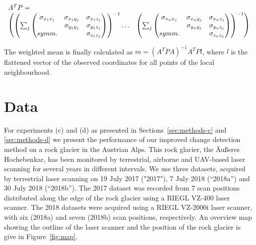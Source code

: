 \documentclass[preprint,12pt,3p]{elsarticle}
\begin{document}
\begin{equation}
\begin{array}{lr}
A^TP = \\
\begin{pmatrix}
 \left(\sum_j  \begin{pmatrix}
 \sigma_{x_1 x_j} & 
\sigma_{x_1 y_j} & 
 \sigma_{x_1 z_j} \\
 & 
\sigma_{y_1 y_j} & 
\sigma_{y_1 z_j} \\
symm. & 
 & 
\sigma_{z_1 z_j} \\
\end{pmatrix} \right ) ^{-1}
\dots
&
\left(\sum_j  \begin{pmatrix}
 \sigma_{x_n x_j} & 
\sigma_{x_n y_j} & 
 \sigma_{x_n z_j} \\
 & 
\sigma_{y_n y_j} & 
\sigma_{y_n z_j} \\
symm. & 
 & 
\sigma_{z_n z_j} \\
\end{pmatrix} \right ) ^{-1}
\end{pmatrix}
\end{array}
\\
\label{eq:ATP}    
\end{equation}

The weighted mean is finally calculated as $m = (A^TPA)^{-1} A^TPl$, where $l$ is the flattened vector of the observed coordinates for all points of the local neighbourhood.


\section{Data}

For experiments (c) and (d) as presented in Sections~\ref{sec:methods-c} and \ref{sec:methods-d} we present the performance of our improved change detection method on a rock glacier in the Austrian Alps. This rock glacier, the Äußeres Hochebenkar, has been monitored by terrestrial, airborne and UAV-based laser scanning for several years in different intervals. We use three datasets, acquired by terrestrial laser scanning on 19 July 2017 ("2017"), 7 July 2018 (“2018a”) and 30 July 2018 (“2018b”). The 2017 dataset was recorded from 7 scan positions distributed along the edge of the rock glacier using a RIEGL VZ-400 laser scanner. The 2018 datasets were acquired using a RIEGL VZ-2000i laser scanner, with six (2018a) and seven (2018b) scan positions, respectively. An overview map showing the outline of the laser scanner and the position of the rock glacier is give in Figure~\ref{fig:map}.
\end{document}
